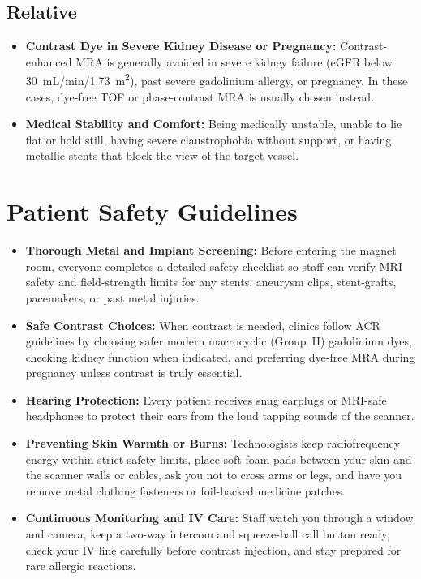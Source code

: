 \subsection{Relative}
\begin{itemize}
\item \textbf{Contrast Dye in Severe Kidney Disease or Pregnancy:} Contrast-enhanced MRA is generally avoided in severe kidney failure (eGFR below 30~mL/min/1.73~m\textsuperscript{2}), past severe gadolinium allergy, or pregnancy. In these cases, dye-free TOF or phase-contrast MRA is usually chosen instead.
\item \textbf{Medical Stability and Comfort:} Being medically unstable, unable to lie flat or hold still, having severe claustrophobia without support, or having metallic stents that block the view of the target vessel.
\end{itemize}

\section{Patient Safety Guidelines}
\begin{itemize}
\item \textbf{Thorough Metal and Implant Screening:} Before entering the magnet room, everyone completes a detailed safety checklist so staff can verify MRI safety and field-strength limits for any stents, aneurysm clips, stent-grafts, pacemakers, or past metal injuries.
\item \textbf{Safe Contrast Choices:} When contrast is needed, clinics follow ACR guidelines by choosing safer modern macrocyclic (Group~II) gadolinium dyes, checking kidney function when indicated, and preferring dye-free MRA during pregnancy unless contrast is truly essential.
\item \textbf{Hearing Protection:} Every patient receives snug earplugs or MRI-safe headphones to protect their ears from the loud tapping sounds of the scanner.
\item \textbf{Preventing Skin Warmth or Burns:} Technologists keep radiofrequency energy within strict safety limits, place soft foam pads between your skin and the scanner walls or cables, ask you not to cross arms or legs, and have you remove metal clothing fasteners or foil-backed medicine patches.
\item \textbf{Continuous Monitoring and IV Care:} Staff watch you through a window and camera, keep a two-way intercom and squeeze-ball call button ready, check your IV line carefully before contrast injection, and stay prepared for rare allergic reactions.
\end{itemize}

